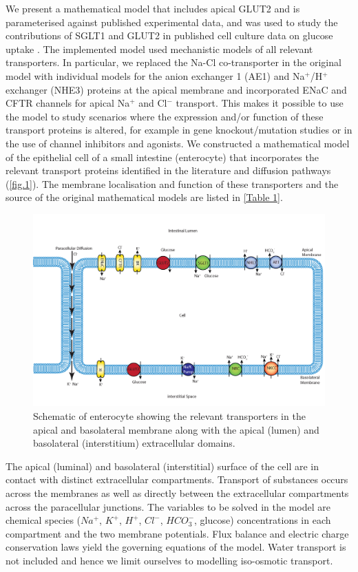 \documentclass[fleqn,10pt]{physiome}
\begin{document}
We present a mathematical model that includes apical GLUT2 and is parameterised against published experimental data, and was used to study the contributions of SGLT1 and GLUT2 in published cell culture data on glucose uptake \citep{zheng2012mechanisms}. The implemented model used mechanistic models of all relevant transporters. In particular, we replaced the Na-Cl co-transporter in the original model with individual models for the anion
exchanger 1 (AE1) and Na$^+$/H$^+$ exchanger (NHE3) proteins at the apical
membrane and incorporated ENaC and CFTR channels for apical Na$^+$ and Cl$^-$ transport.
This makes it possible to use the model to study scenarios where the
expression and/or function of these transport proteins is altered, for example
in gene knockout/mutation studies or in the use of channel inhibitors and agonists. We constructed a mathematical model of the epithelial cell of a small intestine (enterocyte) that incorporates the relevant transport proteins identified in the
literature \citep{barrett2015electrolyte} and diffusion pathways (\autoref{fig.1}). The
membrane localisation and function of these transporters and the source of the
original mathematical models are listed in \autoref{Table 1}.\newline

\begin{figure}[H]
\centering
\includegraphics[width=0.85\linewidth]{fig01.jpg}
\caption{Schematic of enterocyte showing the relevant
transporters in the apical and basolateral membrane along with
the apical (lumen) and basolateral (interstitium) extracellular
domains.}
\label{fig.1}
\end{figure}\newline


The apical (luminal) and
basolateral (interstitial) surface of the cell are in contact with distinct extracellular
compartments. Transport of substances occurs across the membranes as
well as directly between the extracellular compartments across the paracellular
junctions. The variables to be solved in the model are chemical species (${Na^+}$,
${K^+}$, ${H^+}$, ${Cl^-}$, ${HCO_3^-}$, glucose) concentrations in each compartment and the
two membrane potentials. Flux balance and electric charge conservation laws
yield the governing equations of the model. Water transport is not included and
hence we limit ourselves to modelling iso-osmotic transport.\newline
\end{document}
